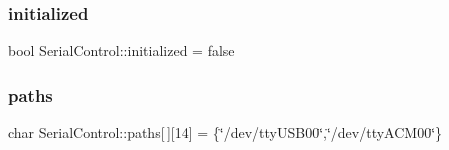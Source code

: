 \subsubsection{\texorpdfstring{initialized}{initialized}}
{\footnotesize\ttfamily bool Serial\+Control\+::initialized = false}

\mbox{\label{namespaceSerialControl_a0ed1846ed80502298402e9cd36725da3}} 
\subsubsection{\texorpdfstring{paths}{paths}}
{\footnotesize\ttfamily char Serial\+Control\+::paths\mbox{[}$\,$\mbox{]}\mbox{[}14\mbox{]} = \{\char`\"{}/dev/tty\+U\+S\+B00\char`\"{},\char`\"{}/dev/tty\+A\+C\+M00\char`\"{}\}}

